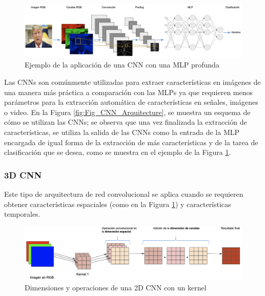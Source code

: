 \begin{onehalfspacing}
\begin{figure}[th]
	\centering
	\includegraphics[width=17cm,keepaspectratio]{XX_Figures/Fig_CNN_Example.png}
	\caption{\footnotesize Ejemplo de la aplicación de una CNN con una MLP profunda}
	\label{fig:Fig_CNN_Example}
\end{figure}

Las CNNs son comúnmente utilizadas para extraer características en imágenes de una manera más práctica a comparación con las MLPs ya que requieren menos parámetros para la extracción automática de características en señales, imágenes o video. En la Figura \ref{fig:Fig_CNN_Arquitecture}, se muestra un esquema de cómo se utilizan las CNNs; se observa que una vez finalizada la extracción de características, se utiliza la salida de las CNNs como la entrada de la MLP encargada de igual forma de la extracción de más características y de la tarea de clasificación que se desea, como se muestra en el ejemplo de la Figura \ref{fig:Fig_CNN_Example}.

\subsubsection{3D CNN}
\label{3DCNN}

Este tipo de arquitectura de red convolucional se aplica cuando se requieren obtener características espaciales (como en la Figura \ref{fig:Fig_CNN_Example}) y características temporales.\\

\begin{figure}[p]
	\centering
	\includegraphics[width=13cm,keepaspectratio]{XX_Figures/Fig_2D_Dimensiones.png}
	\caption{\footnotesize Dimensiones y operaciones de una 2D CNN con un kernel}
	\label{fig:Fig_2D_Dimensiones}
\end{figure}


\end{onehalfspacing}
